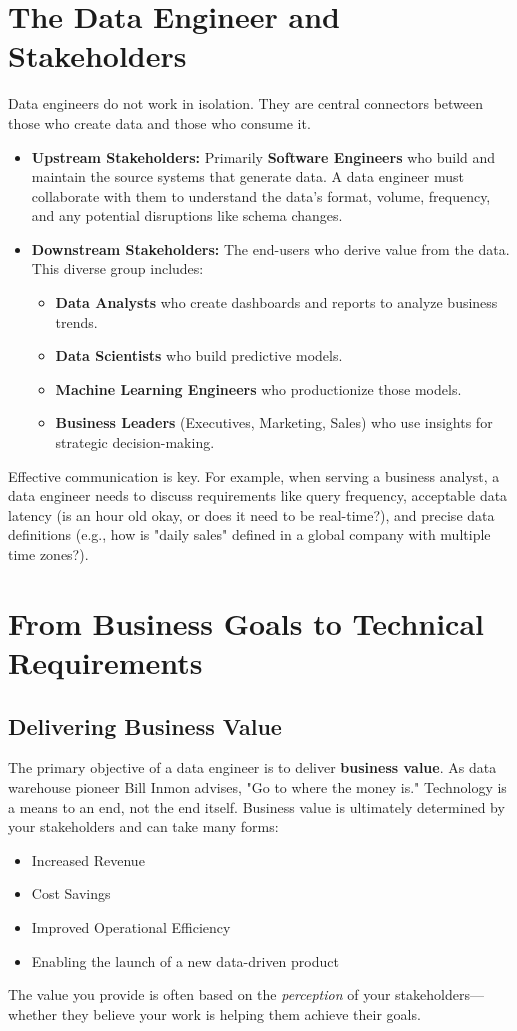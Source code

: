 \documentclass{article}
\begin{document}
\section{The Data Engineer and Stakeholders}
Data engineers do not work in isolation. They are central connectors between those who create data and those who consume it.
\begin{itemize}
    \item \textbf{Upstream Stakeholders:} Primarily \textbf{Software Engineers} who build and maintain the source systems that generate data. A data engineer must collaborate with them to understand the data's format, volume, frequency, and any potential disruptions like schema changes.
    \item \textbf{Downstream Stakeholders:} The end-users who derive value from the data. This diverse group includes:
    \begin{itemize}
        \item \textbf{Data Analysts} who create dashboards and reports to analyze business trends.
        \item \textbf{Data Scientists} who build predictive models.
        \item \textbf{Machine Learning Engineers} who productionize those models.
        \item \textbf{Business Leaders} (Executives, Marketing, Sales) who use insights for strategic decision-making.
    \end{itemize}
\end{itemize}
Effective communication is key. For example, when serving a business analyst, a data engineer needs to discuss requirements like query frequency, acceptable data latency (is an hour old okay, or does it need to be real-time?), and precise data definitions (e.g., how is "daily sales" defined in a global company with multiple time zones?).

\section{From Business Goals to Technical Requirements}
\subsection{Delivering Business Value}
The primary objective of a data engineer is to deliver \textbf{business value}. As data warehouse pioneer Bill Inmon advises, "Go to where the money is." Technology is a means to an end, not the end itself. Business value is ultimately determined by your stakeholders and can take many forms:
\begin{itemize}
    \item Increased Revenue
    \item Cost Savings
    \item Improved Operational Efficiency
    \item Enabling the launch of a new data-driven product
\end{itemize}
The value you provide is often based on the \textit{perception} of your stakeholders—whether they believe your work is helping them achieve their goals.
\end{document}
